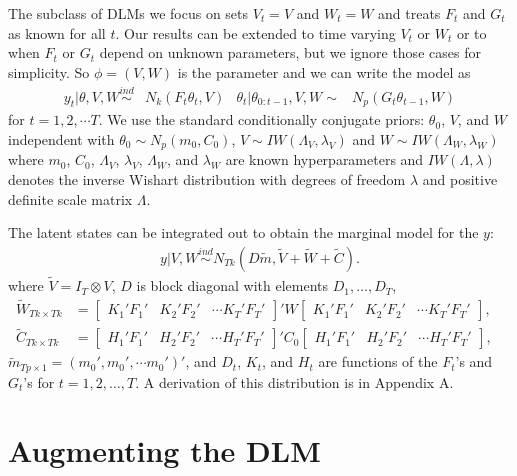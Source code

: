 \documentclass[12pt]{article}
\begin{document}
The subclass of DLMs we focus on sets $V_t=V$ and $W_t=W$ and treats $F_{t}$ and $G_{t}$ as known for all $t$. Our results can be extended to time varying $V_t$ or $W_t$ or to when $F_t$ or $G_t$ depend on unknown parameters, but we ignore those cases for simplicity. So $\phi=(V,W)$ is the parameter and we can write the model as
\begin{align}
  y_t|\theta,V,W \stackrel{ind}{\sim} & N_k(F_t\theta_t,V) &
  \theta_t|\theta_{0:t-1},V,W  \sim & N_p(G_t\theta_{t-1},W) \label{dlmbotheqs}
\end{align}
for $t=1,2,\cdots T$. We use the standard conditionally conjugate priors: $\theta_0$, $V$, and $W$ independent with $\theta_0 \sim N_p(m_0, C_0)$, $V \sim IW(\Lambda_V, \lambda_V)$ and $W \sim IW(\Lambda_W, \lambda_W)$ where $m_0$, $C_0$, $\Lambda_V$, $\lambda_V$, $\Lambda_W$, and $\lambda_W$ are known hyperparameters and $IW(\Lambda, \lambda)$ denotes the inverse Wishart distribution with degrees of freedom $\lambda$ and positive definite scale matrix $\Lambda$.

The latent states can be integrated out to obtain the marginal model for the $y$:
\begin{align}
  y|V,W \stackrel{ind}{\sim} N_{Tk}(D\tilde{m}, \tilde{V} + \tilde{W} + \tilde{C}). \label{margmodel}
\end{align}
where $\tilde{V}=I_T\otimes V$, $D$ is block diagonal with elements $D_1,\ldots,D_T$, 
\begin{align*}
\tilde{W}_{Tk\times Tk} &= \begin{bmatrix} K_1'F_1' & K_2'F_2' & \cdots K_T'F_T' \end{bmatrix}' W \begin{bmatrix} K_1'F_1' & K_2'F_2' & \cdots K_T'F_T' \end{bmatrix}, &\\
\tilde{C}_{Tk\times Tk} &= \begin{bmatrix} H_1'F_1' & H_2'F_2' & \cdots H_T'F_T' \end{bmatrix}' C_0 \begin{bmatrix} H_1'F_1' & H_2'F_2' & \cdots H_T'F_T' \end{bmatrix},&
\end{align*}
$\tilde{m}_{Tp\times 1} = (m_0', m_0', \cdots m_0')'$, and $D_t$, $K_t$, and $H_t$ are functions of the $F_t$'s and $G_t$'s for $t=1,2,\dots,T$. A derivation of this distribution is in Appendix A.



\section{Augmenting the DLM}\label{sec:DAs}
\end{document}
